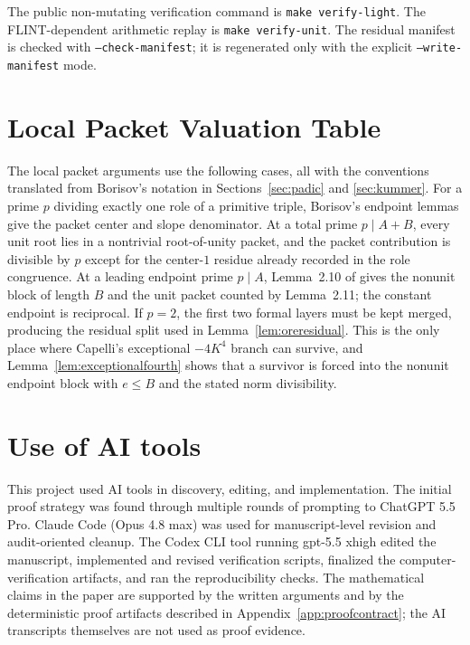 \documentclass[11pt]{article}
\numberwithin{equation}{section}
\theoremstyle{definition}
\begin{document}
The public non-mutating verification command is \texttt{make verify-light}.
The FLINT-dependent arithmetic replay is \texttt{make verify-unit}.  The
residual manifest is checked with \texttt{--check-manifest}; it is regenerated
only with the explicit \texttt{--write-manifest} mode.

\section{Local Packet Valuation Table}
\label{app:localpackets}

The local packet arguments use the following cases, all with the conventions
translated from Borisov's notation in Sections~\ref{sec:padic} and
\ref{sec:kummer}.  For a prime \(p\) dividing exactly one role of a primitive
triple, Borisov's endpoint lemmas give the packet center and slope denominator.
At a total prime \(p\mid A+B\), every unit root lies in a nontrivial
root-of-unity packet, and the packet contribution is divisible by \(p\) except
for the center-\(1\) residue already recorded in the role congruence.  At a
leading endpoint prime \(p\mid A\), Lemma~2.10 of \cite{Borisov1998} gives the
nonunit block of length \(B\) and the unit packet counted by Lemma~2.11; the
constant endpoint is reciprocal.  If \(p=2\), the first two formal layers must
be kept merged, producing the residual split used in
Lemma~\ref{lem:oreresidual}.  This is the only place where Capelli's
exceptional \(-4K^4\) branch can survive, and
Lemma~\ref{lem:exceptionalfourth} shows that a survivor is forced into the
nonunit endpoint block with \(e\leq B\) and the stated norm divisibility.

\section*{Use of AI tools}

This project used AI tools in discovery, editing, and implementation.  The
initial proof strategy was found through multiple rounds of prompting to
ChatGPT 5.5 Pro.  Claude Code (Opus 4.8 max) was used for manuscript-level
revision and audit-oriented cleanup.  The Codex CLI tool running gpt-5.5 xhigh
edited the manuscript, implemented and revised verification scripts, finalized
the computer-verification artifacts, and ran the reproducibility checks.  The
mathematical claims in the paper are supported by the written arguments and by
the deterministic proof artifacts described in Appendix~\ref{app:proofcontract};
the AI transcripts themselves are not used as proof evidence.
\end{document}
